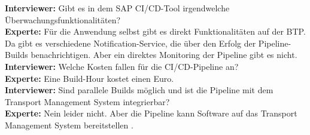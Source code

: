 \begin{linenumbers}
\textbf{Interviewer:} Gibt es in dem SAP CI/CD-Tool irgendwelche Überwachungsfunktionalitäten?\\ 
\textbf{Experte:} Für die Anwendung selbst gibt es direkt Funktionalitäten auf der BTP. Da gibt es verschiedene Notification-Service, die über den Erfolg der Pipeline-Builds benachrichtigen. Aber ein direktes Monitoring der Pipeline gibt es nicht.\\
\textbf{Interviewer:} Welche Kosten fallen für die CI/CD-Pipeline an?\\
\textbf{Experte:} Eine Build-Hour kostet einen Euro.\\
\textbf{Interviewer:} Sind parallele Builds möglich und ist die Pipeline mit dem Transport Management System integrierbar?\\
\textbf{Experte:} Nein leider nicht. Aber die Pipeline kann Software auf das Transport Management System bereitstellen \cite{ProductOwnerSAPBTPProd&Infra.}.\\
\end{linenumbers}
\newpage
\resetlinenumber
